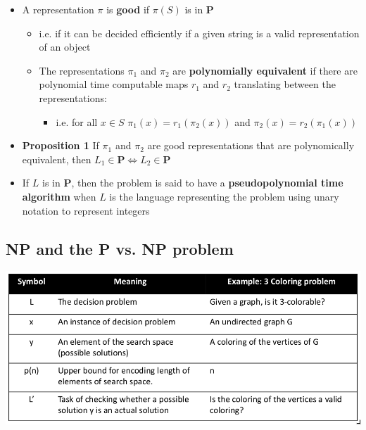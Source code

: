 \documentclass[11pt]{article}
\begin{document}
\begin{itemize}
\item A representation \(\pi\) is \textbf{good} if \(\pi(S)\) is in \(\mathbf P\)
\begin{itemize}
\item i.e. if it can be decided efficiently if a given string is a valid representation of an object
\item The representations \(\pi_1\) and \(\pi_2\) are \textbf{polynomially equivalent} if there are polynomial time computable maps \(r_1\) and \(r_2\) translating between the representations:
\begin{itemize}
\item i.e. for all \(x \in S\) \(\pi_1(x) = r_1(\pi_2(x))\) and \(\pi_2(x) = r_2(\pi_1(x))\)
\end{itemize}
\end{itemize}

\item \textbf{Proposition 1} If \(\pi_1\) and \(\pi_2\) are good representations that are polynomically equivalent, then \(L_1 \in \mathbf P \Leftrightarrow L_2 \in \mathbf P\)

\item If \(L\) is in \(\mathbf P\), then the problem is said to have a \textbf{pseudopolynomial time algorithm} when \(L\) is the language representing the problem using unary notation to represent integers
\end{itemize}

\subsection{NP and the P vs. NP problem}
\label{sec:orge35e810}
\begin{center}
\includegraphics[width=.9\linewidth]{P, NP and NPC/screenshot_2019-03-27_12-02-06.png}
\end{center} 
\end{document}
